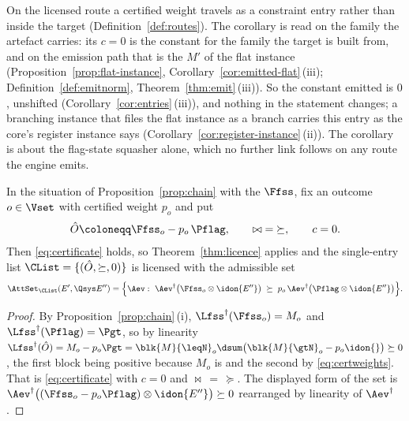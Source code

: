 
On the licensed route a certified weight travels as a constraint entry rather
than inside the target (Definition~\ref{def:routes}). The corollary is read on
the family the artefact carries: its $c=0$ is the constant for the family the
target is built from, and on the emission path that is the
 $M'$ of the flat instance (Proposition~\ref{prop:flat-instance},
Corollary~\ref{cor:emitted-flat}\,(iii); Definition~\ref{def:emitnorm},
Theorem~\ref{thm:emit}\,(iii)). So the constant emitted is $0$, unshifted
(Corollary~\ref{cor:entries}\,(iii)), and nothing in the statement changes; a
branching instance that files the flat instance as a branch carries this entry
as the core's register instance says
(Corollary~\ref{cor:register-instance}\,(ii)). The corollary is about the
flag-state squasher alone, which no further link follows on any route the
engine emits.

\begin{corollary}\label{cor:fssinstance}
In the situation of Proposition~\ref{prop:chain} with the
 $\Ffss$, fix an outcome $o\in\Vset$ with certified
weight $p_o$ and put
\begin{equation}\label{eq:fssentry}
  \hat O\coloneqq\Ffss_o-p_o\,\Pflag,
  \qquad \bowtie\;=\;\succeq,\qquad c=0 .
\end{equation}
Then \eqref{eq:certificate} holds, so Theorem~\ref{thm:licence} applies and the
single-entry list $\CList=\{(\hat O,\succeq,0)\}$ is licensed with the
admissible set
\begin{equation}\label{eq:fssattset}
  \AttSet_{\CList}(E',\Qsys E'')
  =\Big\{\Aev:\ \Aev^{\dagger}\big(\Ffss_o\otimes\idon{E''}\big)
  \;\succeq\;p_o\,\Aev^{\dagger}\big(\Pflag\otimes\idon{E''}\big)\Big\}.
\end{equation}
\end{corollary}

\begin{proof}
By Proposition~\ref{prop:chain}\,(i),
$\Lfss^{\dagger}(\Ffss_o)=M_o$ and $\Lfss^{\dagger}(\Pflag)=\Pgt$, so by
linearity $\Lfss^{\dagger}(\hat O)=M_o-p_o\Pgt
=\blk{M}{\leqN}_o\dsum\big(\blk{M}{\gtN}_o-p_o\idon{}\big)\succeq0$, the first
block being positive because $M_o$ is and the second by
\eqref{eq:certweights}. That is \eqref{eq:certificate} with $c=0$ and
$\bowtie\,=\,\succeq$. The displayed form of the set is
$\Aev^{\dagger}\big((\Ffss_o-p_o\Pflag)\otimes\idon{E''}\big)\succeq0$
rearranged by linearity of $\Aev^{\dagger}$.
\end{proof}
